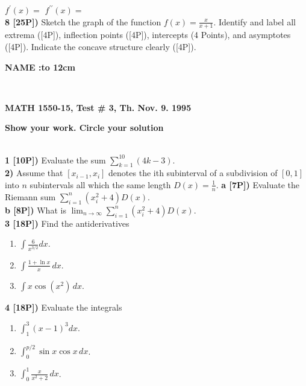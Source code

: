 \documentclass[12pt]{article}
\begin{document}
\hfill${\displaystyle f^\prime(x) = }$\hspace{5cm} ${\displaystyle f^{\prime\prime}(x) =
}$\hspace{5cm}\hfill
\\ %
{\bf 8 [25P])} Sketch the graph of the function
${\displaystyle f(x) = \frac{x}{x+1}}$. Identify and label all
extrema ([4P]), inflection points ([4P]), intercepts
(4 Points), and asymptotes ([4P]). Indicate the concave structure
clearly ([4P]).
\centerline{\large\bf NAME :\hbox to 12cm{\hrulefill}}
\\ %
\centerline{\bf MATH 1550-15, Test \# 3, Th. Nov. 9. 1995}
\centerline{\bf Show your work. Circle your solution}
\\ %
{\bf 1 [10P])} Evaluate the sum ${\displaystyle \sum_{k=1}^{10}\left(4 k - 3\right)}$.  
\\ %
{\bf 2)} Assume that ${\displaystyle [x_{i-1},x_i]}$ denotes the
ith subinterval of a subdivision of ${\displaystyle [0,1]}$
into $n$ subintervals all which the same length ${\displaystyle
D (x) = \frac{1}{n}}$.
{\bf a [7P])} Evaluate the Riemann sum ${\displaystyle
\sum_{i=1}^n \left(x_i^2 + 4\right)D (x)}$.
\\ %
{\bf b [8P])} What is ${\displaystyle
\lim_{n\to \infty}
\sum_{i=1}^n \left(x_i^2 + 4\right)D (x)}$.
\\ %
{\bf 3 [18P])} Find the antiderivatives
\begin{enumerate}
\item ${\displaystyle \int \frac{6}{x^{3/2}}dx}$.
\item ${\displaystyle \int \frac{1 + \ln x}{x}\, dx}$.
\item ${\displaystyle \int x \cos (x^2)\, dx }$.
\end{enumerate}

{\bf 4 [18P])} Evaluate the integrals
\begin{enumerate}
\item ${\displaystyle \int_1^3 \left( x - 1\right)^3 dx}$.
\item ${\displaystyle \int_0^{p / 2} \sin x \cos x\, dx}$.
\item ${\displaystyle \int_0^1 \frac{x}{x^2 + 2} \, dx }$.
\end{enumerate}
\end{document}
